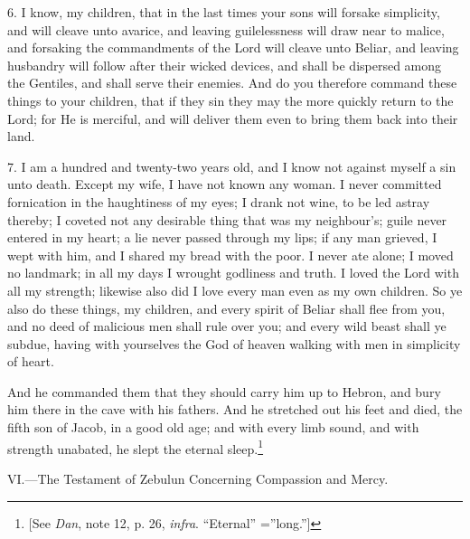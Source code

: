 6. I know, my children, that in the last times your sons will forsake simplicity, and will cleave unto avarice, and leaving guilelessness will draw near to malice, and forsaking the commandments of the Lord will cleave unto Beliar, and leaving husbandry will follow after their wicked devices, and shall be dispersed among the Gentiles, and shall serve their enemies. And do you therefore command these things to your children, that if they sin they may the more quickly return to the Lord; for He is merciful, and will deliver them even to bring them back into their land.

7. I am a hundred and twenty-two years old, and I know not against myself a sin unto death. Except my wife, I have not known any woman. I never committed fornication in the haughtiness of my eyes; I drank not wine, to be led astray thereby; I coveted not any desirable thing that was my neighbour’s; guile never entered in my heart; a lie never passed through my lips; if any man grieved, I wept with him, and I shared my bread with the poor. I never ate alone; I moved no landmark; in all my days I wrought godliness and truth. I loved the Lord with all my strength; likewise also did I love every man even as my own children. So ye also do these things, my children, and every spirit of Beliar shall flee from you, and no deed of malicious men shall rule over you; and every wild beast shall ye subdue, having with yourselves the God of heaven walking with men in simplicity of heart.

And he commanded them that they should carry him up to Hebron, and bury him there in the cave with his fathers. And he stretched out his feet and died, the fifth son of Jacob, in a good old age; and with every limb sound, and with strength unabated, he slept the eternal sleep.\footnote{[See \emph{Dan}, note 12, p. 26, \emph{infra}. “Eternal” =''long.”]}


VI.—The Testament of Zebulun Concerning Compassion and Mercy.

